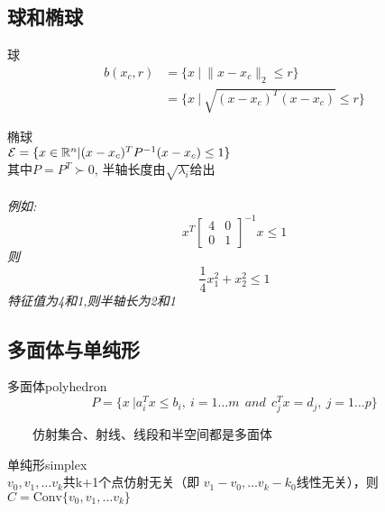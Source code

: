 \documentclass{mytemplate}
\begin{document}
\subsection{球和椭球}
\begin{definition}{球}
    \begin{align}
        b(x_c, r) & =\{x\ |\ \|x-x_c\|_2 \leq r\}             \\
                  & =\{x\ |\ \sqrt{(x-x_c)^T (x-x_c)}\leq r\}
    \end{align}
\end{definition}
\begin{definition}{椭球}\\
    $\mathcal{E}=\{x \in \mathbb{R}^n | (x - x_c)^T P^{-1} (x-x_c) \leq 1\}$ \\
    其中$P=P^T \succ 0$, 半轴长度由$\sqrt{\lambda_i}$给出\\
    \\
    \emph{例如:\[
        x^T\begin{bmatrix}
            4 & 0 \\
            0 & 1
        \end{bmatrix}^{-1}x \leq 1
    \]
    则\[
        \frac{1}{4}x_1^2 + x_2^2 \leq 1
    \]
    特征值为4和1,则半轴长为2和1}
\end{definition}

\subsection{多面体与单纯形}
\begin{definition}{多面体polyhedron}
    \[
        P = \{
        x\ | a_i^T x \leq b_i,\ i = 1\dots m\ \ and\ \
        c_j^T x = d_j,\ j=1\dots p
        \}
    \]
\end{definition}
\ \ \ \ 仿射集合、射线、线段和半空间都是多面体

\begin{definition}{单纯形simplex}\\
    \(v_0,v_1, \dots v_k\)共k+1个点仿射无关（即
    \(v_1-v_0,\dots v_k-k_0\)线性无关），则$C=\text{Conv}\{v_0,v_1,\dots v_k\}$
\end{definition}

\newpage
\end{document}
